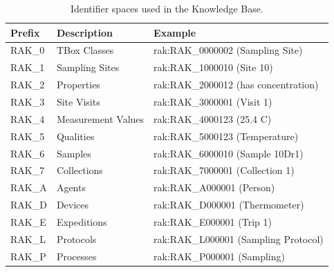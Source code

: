\begin{table}[h]
	\centering
	\caption{Identifier spaces used in the Knowledge Base.}
	\label{tab:id_spaces}
	\begin{tabular}{lll}
		\toprule
		Prefix & Description        & Example                              \\
		\midrule
		RAK\_0 & TBox Classes       & rak:RAK\_0000002 (Sampling Site)     \\
		RAK\_1 & Sampling Sites     & rak:RAK\_1000010 (Site 10)           \\
		RAK\_2 & Properties         & rak:RAK\_2000012 (has concentration) \\
		RAK\_3 & Site Visits        & rak:RAK\_3000001 (Visit 1)           \\
		RAK\_4 & Measurement Values & rak:RAK\_4000123 (25.4 C)            \\
		RAK\_5 & Qualities          & rak:RAK\_5000123 (Temperature)       \\
		RAK\_6 & Samples            & rak:RAK\_6000010 (Sample 10Dr1)      \\
		RAK\_7 & Collections        & rak:RAK\_7000001 (Collection 1)      \\
		RAK\_A & Agents             & rak:RAK\_A000001 (Person)            \\
		RAK\_D & Devices            & rak:RAK\_D000001 (Thermometer)       \\
		RAK\_E & Expeditions        & rak:RAK\_E000001 (Trip 1)            \\
		RAK\_L & Protocols          & rak:RAK\_L000001 (Sampling Protocol) \\
		RAK\_P & Processes          & rak:RAK\_P000001 (Sampling)          \\
		\bottomrule
	\end{tabular}
\end{table}
